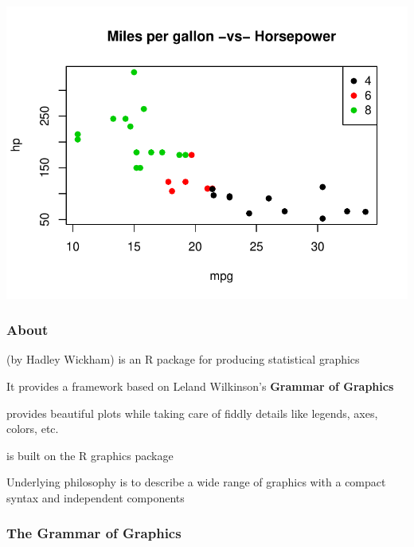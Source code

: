 \documentclass[12pt]{beamer}\usepackage[]{graphicx}\usepackage[]{color}
\newenvironment{knitrout}{}{} %
\begin{document}
\begin{frame}[fragile]
\begin{knitrout}\scriptsize
{}\color{fgcolor}

{\centering \includegraphics[width=.9\linewidth,height=.65\linewidth]{figure/unnamed-chunk-2-1} 

}



\end{knitrout}
\end{frame}


\begin{frame}
\frametitle{About }

\bi
  \item {} (by Hadley Wickham) is an R package for producing statistical graphics
  \item It provides a framework based on Leland Wilkinson's \textbf{Grammar of Graphics}
  \item {} provides beautiful plots while taking care of fiddly details like legends, axes, colors, etc.
  \item {} is built on the R graphics package 
  \item Underlying philosophy is to describe a wide range of graphics with a compact syntax and independent components
\ei

\end{frame}


\begin{frame}[fragile]
\frametitle{The Grammar of Graphics}
\begin{center}
\end{center}
\end{frame}
\end{document}
